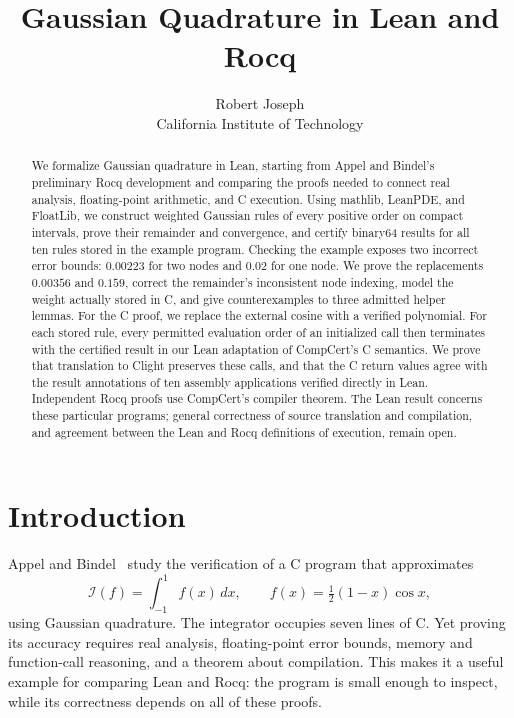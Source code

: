 \documentclass[11pt]{article}
\title{Gaussian Quadrature in Lean and Rocq}
\author{Robert Joseph\\[0.3em]
  \normalsize California Institute of Technology}
\date{}
\newcommand{\I}{\mathcal{I}}
\begin{document}
\maketitle

\begin{abstract}
We formalize Gaussian quadrature in Lean, starting from Appel and Bindel's
preliminary Rocq development and comparing the proofs needed to connect real analysis,
floating-point arithmetic, and C execution. Using mathlib, LeanPDE, and
FloatLib, we construct weighted Gaussian rules of every positive order on
compact intervals, prove their remainder and convergence, and certify
binary64 results for all ten rules stored in the example program. Checking
the example exposes two incorrect error bounds: $0.00223$ for two nodes
and $0.02$ for one node. We prove the replacements $0.00356$ and $0.159$,
correct the remainder's inconsistent node indexing, model the weight
actually stored in C, and give counterexamples
to three admitted helper lemmas. For the C proof, we replace the external
cosine with a verified polynomial. For each stored rule, every permitted
evaluation order of an initialized call then terminates with the certified
result in our Lean adaptation of CompCert's C semantics. We prove that
translation to Clight preserves these calls, and that the C return values
agree with the result annotations of ten assembly applications verified
directly in Lean. Independent Rocq proofs use CompCert's compiler theorem.
The Lean result concerns these particular programs; general correctness of
source translation and compilation, and agreement between the Lean and Rocq
definitions of execution, remain open.
\end{abstract}

\section{Introduction}
\label{sec:intro}

Appel and Bindel~\cite{appelbindel} study the verification of a C program
that approximates
\begin{equation}
  \I(f)=\int_{-1}^{1}f(x)\,dx,
  \qquad f(x)=\tfrac12(1-x)\cos x,
  \label{eq:example}
\end{equation}
using Gaussian quadrature. The integrator occupies seven lines of C. Yet
proving its accuracy requires real analysis, floating-point error bounds,
memory and function-call reasoning, and a theorem about compilation. This
makes it a useful example for comparing Lean and Rocq: the program is small
enough to inspect, while its correctness depends on all of these proofs.
\end{document}
